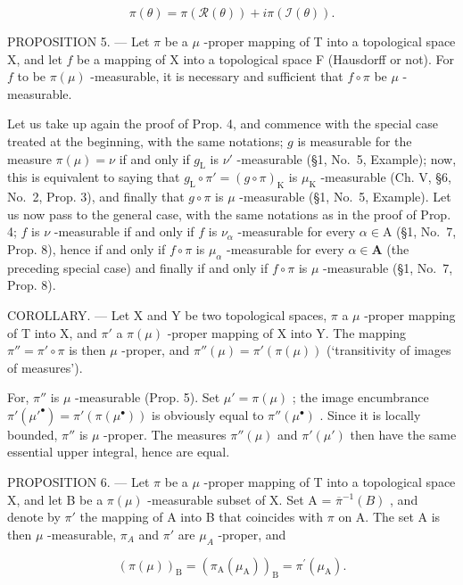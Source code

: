 \[
\pi (\theta) = \pi (\mathcal {R} (\theta)) + i \pi (\mathcal {I} (\theta)).
\]

PROPOSITION 5. --- Let \(\pi\) be a \(\mu\) -proper mapping of T into a topological space X, and let \(f\) be a mapping of X into a topological space F (Hausdorff or not). For \(f\) to be \(\pi(\mu)\) -measurable, it is necessary and sufficient that \(f \circ \pi\) be \(\mu\) -measurable.

Let us take up again the proof of Prop. 4, and commence with the special case treated at the beginning, with the same notations; \(g\) is measurable for the measure \(\pi(\mu) = \nu\) if and only if \(g_{\mathrm{L}}\) is \(\nu'\) -measurable (§1, No.~5, Example); now, this is equivalent to saying that \(g_{\mathrm{L}} \circ \pi' = (g \circ \pi)_{\mathrm{K}}\) is \(\mu_{\mathrm{K}}\) -measurable (Ch. V, §6, No.~2, Prop. 3), and finally that \(g \circ \pi\) is \(\mu\) -measurable (§1, No.~5, Example). Let us now pass to the general case, with the same notations as in the proof of Prop. 4; \(f\) is \(\nu\) -measurable if and only if \(f\) is \(\nu_{\alpha}\) -measurable for every \(\alpha \in \mathrm{A}\) (§1, No.~7, Prop. 8), hence if and only if \(f \circ \pi\) is \(\mu_{\alpha}\) -measurable for every \(\alpha \in \mathbf{A}\) (the preceding special case) and finally if and only if \(f \circ \pi\) is \(\mu\) -measurable (§1, No.~7, Prop. 8).

COROLLARY. --- Let X and Y be two topological spaces, \(\pi\) a \(\mu\) -proper mapping of T into X, and \(\pi'\) a \(\pi(\mu)\) -proper mapping of X into Y. The mapping \(\pi'' = \pi' \circ \pi\) is then \(\mu\) -proper, and \(\pi''(\mu) = \pi'(\pi(\mu))\) (`transitivity of images of measures').

For, \(\pi''\) is \(\mu\) -measurable (Prop. 5). Set \(\mu' = \pi(\mu)\) ; the image encumbrance \(\pi'(\mu'^{\bullet}) = \pi'(\pi(\mu^{\bullet}))\) is obviously equal to \(\pi''(\mu^{\bullet})\) . Since it is locally bounded, \(\pi''\) is \(\mu\) -proper. The measures \(\pi''(\mu)\) and \(\pi'(\mu')\) then have the same essential upper integral, hence are equal.

PROPOSITION 6. --- Let \(\pi\) be a \(\mu\) -proper mapping of T into a topological space X, and let B be a \(\pi(\mu)\) -measurable subset of X. Set A = \(\overline{\pi}^{-1}(B)\) , and denote by \(\pi'\) the mapping of A into B that coincides with \(\pi\) on A. The set A is then \(\mu\) -measurable, \(\pi_A\) and \(\pi'\) are \(\mu_A\) -proper, and

\[
\left(\pi (\mu)\right) _ {\mathrm{B}} = \left(\pi_ {\mathrm{A}} (\mu_ {\mathrm{A}})\right) _ {\mathrm{B}} = \pi^ {\prime} (\mu_ {\mathrm{A}}).\tag{2}
\]

